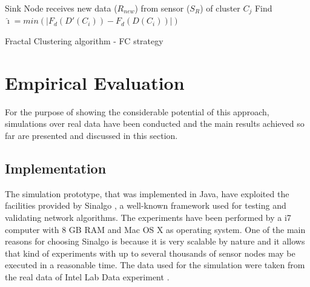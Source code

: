 \documentclass{acm_proc_article-sp}
\begin{document}
\begin{algorithm}
 \SetAlgoLined
 \LinesNumbered
 \small
 Sink Node receives new data ($R_{new}$) from sensor ($S_{R}$) of cluster $C_j$\;
  Find $\hat{\imath} = min(|F_d(D'(C_i)) - F_d(D(C_i))|)$\;
 \caption{Fractal Clustering algorithm - FC strategy}
 \label{alg:MDFD}
\end{algorithm}


\section{Empirical Evaluation}
\label{eval}

For the purpose of showing the considerable potential of this approach,
simulations over real data have been conducted and the main results achieved so
far are presented and discussed in this section.

\subsection{Implementation}
\label{implementation}

The simulation prototype, that was implemented in Java, have exploited the
facilities provided by Sinalgo \cite{Sinalgo2007}, a well-known framework used
for testing and validating network algorithms. The experiments have been
performed by a i7 computer with 8 GB RAM and Mac OS X as operating system.
One of the main reasons for choosing Sinalgo is because it is very scalable by
nature and it allows that kind of experiments with up to several thousands of
sensor nodes may be executed in a reasonable time. The data used for the
simulation were taken from the real data of Intel Lab Data experiment
\cite{Intel2004}.
\end{document}

